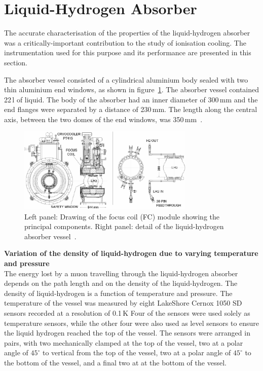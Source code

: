 \graphicspath{{07-Absorber/Figures/}}

\section{Liquid-Hydrogen Absorber}
\label{Sect:Absorber}

The accurate characterisation of the properties of the liquid-hydrogen
absorber was a critically-important contribution to the study of
ionisation cooling.
The instrumentation used for this purpose and its performance are
presented in this section.

The absorber vessel consisted of a cylindrical aluminium body sealed
with two thin aluminium end windows, as shown in
figure~\ref{Fig:AbsorberVessel:Diag}.
The absorber vessel contained 22\,l of liquid.
The body of the absorber had an inner diameter of 300\,mm and the end
flanges were separated by a distance of 230\,mm.  
The length along the central axis, between the
two domes of the end windows, was 350\,mm~\cite{1748-0221-13-09-T09008}. \\
\begin{figure}
  \begin{center}
    \includegraphics[width=0.75\textwidth]{AFC-drwng.pdf}
  \end{center}
  \caption{
    Left panel: Drawing of the focus coil (FC) module
    showing the principal components.
    Right panel: detail of the liquid-hydrogen absorber vessel~\cite{1748-0221-13-09-T09008}.
  }
  \label{Fig:AbsorberVessel:Diag}
\end{figure}

\noindent\textbf{Variation of the density of liquid-hydrogen due to
    varying temperature and pressure} \\
\noindent
The energy lost by a muon travelling through the liquid-hydrogen
absorber depends on the path length and on
the density of the liquid-hydrogen. The density of liquid-hydrogen is
a function of temperature and pressure.  
The temperature of the vessel was measured by eight LakeShore Cernox
1050 SD sensors recorded at a resolution of 0.1\,K
Four of the sensors were used solely as temperature sensors, while the
other four were also used as level sensors to ensure the
liquid hydrogen reached the top of the vessel. 
The sensors were arranged in pairs, with two mechanically clamped at
the top of the vessel, two at a polar angle of ${45}^{\circ}$ to
vertical from the top of the vessel, two at a polar angle of
${45}^{\circ}$ to the bottom of the vessel, and a
final two at at the bottom of the vessel. 

